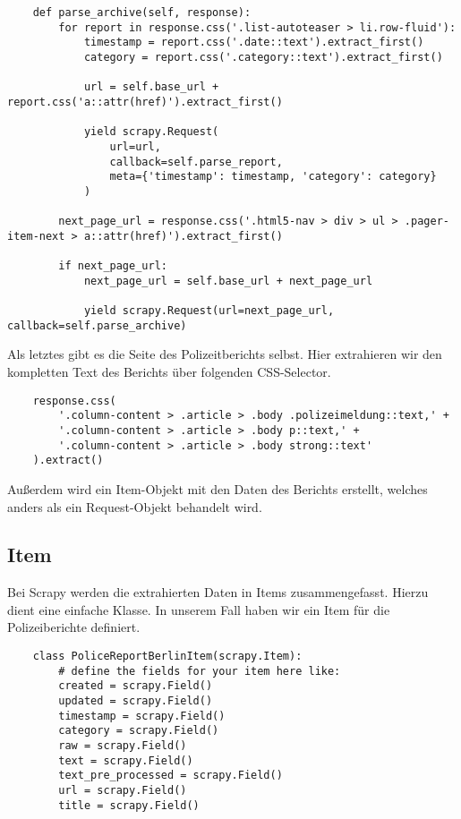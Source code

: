 \begin{verbatim}
    def parse_archive(self, response):
        for report in response.css('.list-autoteaser > li.row-fluid'):
            timestamp = report.css('.date::text').extract_first()
            category = report.css('.category::text').extract_first()

            url = self.base_url + report.css('a::attr(href)').extract_first()

            yield scrapy.Request(
                url=url,
                callback=self.parse_report,
                meta={'timestamp': timestamp, 'category': category}
            )

        next_page_url = response.css('.html5-nav > div > ul > .pager-item-next > a::attr(href)').extract_first()

        if next_page_url:
            next_page_url = self.base_url + next_page_url

            yield scrapy.Request(url=next_page_url, callback=self.parse_archive)
    \end{verbatim}

\pagebreak

Als letztes gibt es die Seite des Polizeitberichts selbst.
Hier extrahieren wir den kompletten Text des Berichts über folgenden CSS-Selector.

\begin{verbatim}
    response.css(
        '.column-content > .article > .body .polizeimeldung::text,' +
        '.column-content > .article > .body p::text,' +
        '.column-content > .article > .body strong::text'
    ).extract()
    \end{verbatim}

Außerdem wird ein Item-Objekt mit den Daten des Berichts erstellt, welches anders als ein Request-Objekt behandelt wird.

\subsection{Item}

Bei Scrapy werden die extrahierten Daten in Items zusammengefasst. Hierzu dient eine einfache Klasse.
In unserem Fall haben wir ein Item für die Polizeiberichte definiert.

\begin{verbatim}
    class PoliceReportBerlinItem(scrapy.Item):
        # define the fields for your item here like:
        created = scrapy.Field()
        updated = scrapy.Field()
        timestamp = scrapy.Field()
        category = scrapy.Field()
        raw = scrapy.Field()
        text = scrapy.Field()
        text_pre_processed = scrapy.Field()
        url = scrapy.Field()
        title = scrapy.Field()
    \end{verbatim}

